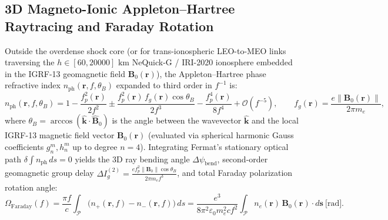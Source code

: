 \documentclass[11pt,a4paper]{article}
\theoremstyle{plain}
\theoremstyle{definition}
\theoremstyle{remark}
\begin{document}
\subsection{3D Magneto-Ionic Appleton--Hartree Raytracing and Faraday Rotation}

Outside the overdense shock core (or for trans-ionospheric LEO-to-MEO links traversing the $h \in [60, 20000]\text{ km}$ NeQuick-G / IRI-2020 ionosphere embedded in the IGRF-13 geomagnetic field $\mathbf{B}_0(\mathbf{r})$), the Appleton--Hartree phase refractive index $n_{\text{ph}}(\mathbf{r}, f, \theta_B)$ expanded to third order in $f^{-1}$ is:
\begin{equation}\label{eq:appleton_hartree}
  n_{\text{ph}}(\mathbf{r}, f, \theta_B) = 1 - \frac{f_p^2(\mathbf{r})}{2 f^2} \pm \frac{f_p^2(\mathbf{r})\,f_g(\mathbf{r})\cos\theta_B}{2 f^3} - \frac{f_p^4(\mathbf{r})}{8 f^4} + \mathcal{O}(f^{-5}), \qquad f_g(\mathbf{r}) = \frac{e \|\mathbf{B}_0(\mathbf{r})\|}{2\pi m_e},
\end{equation}
where $\theta_B = \arccos(\hat{\mathbf{k}}\cdot\hat{\mathbf{B}}_0)$ is the angle between the wavevector $\hat{\mathbf{k}}$ and the local IGRF-13 magnetic field vector $\mathbf{B}_0(\mathbf{r})$ (evaluated via spherical harmonic Gauss coefficients $g_n^m, h_n^m$ up to degree $n=4$). Integrating Fermat's stationary optical path $\delta \int n_{\text{ph}}\,ds = 0$ yields the 3D ray bending angle $\Delta\psi_{\text{bend}}$, second-order geomagnetic group delay $\Delta I_g^{(2)} = \frac{e f_p^2 \|\mathbf{B}_0\|\cos\theta_B}{2\pi m_e f^3}$, and total Faraday polarization rotation angle:
\begin{equation}\label{eq:faraday_rotation}
  \Omega_{\text{Faraday}}(f) = \frac{\pi f}{c} \int_{\mathcal{P}} \bigl(n_+(\mathbf{r},f) - n_-(\mathbf{r},f)\bigr)\,ds = \frac{e^3}{8\pi^2 \varepsilon_0 m_e^2 c f^2} \int_{\mathcal{P}} n_e(\mathbf{r})\,\mathbf{B}_0(\mathbf{r})\cdot d\mathbf{s} \ \text{[rad]}.
\end{equation}
\end{document}
